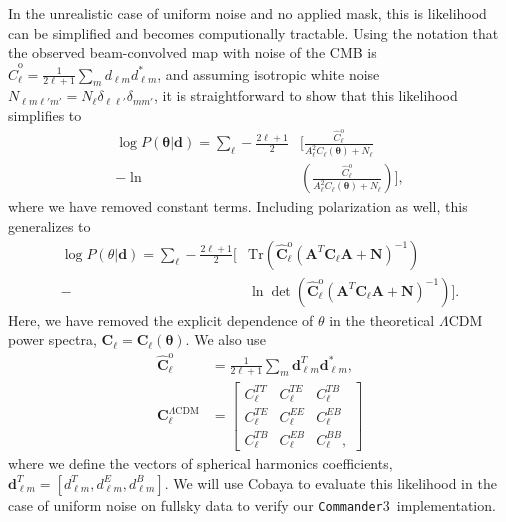 \documentclass[twocolumn]{../common/aa}
\def\commander{\texttt{Commander}}
\begin{document}
In the unrealistic case of uniform noise and no applied mask, this is likelihood can be simplified and becomes computionally tractable. Using the notation that the observed beam-convolved map with noise of the CMB is $\hat{C}^{\mathrm{o}}_{\ell} = \frac{1}{2\ell+1}\sum_m d_{\ell m}d^*_{\ell m}$, and assuming isotropic white noise $N_{\ell m \ell'm'} = N_\ell \delta_{\ell \ell'}\delta_{mm'}$, it is straightforward to show that this likelihood simplifies to
\begin{align}
    \nonumber
    \log P(\boldsymbol{\theta} | \boldsymbol{d}) = \sum_{\ell} -\frac{2\ell+1}{2} &\bigg[\frac{\hat{C}^{\mathrm{o}}_{\ell}}{A_\ell^2 C_{\ell}(\boldsymbol{\theta}) + N_\ell}\\
    -\ln &\left(\frac{\hat{C}^{\mathrm{o}}_{\ell}}{A_\ell^2 C_{\ell}(\boldsymbol{\theta}) + N_\ell} \right) \bigg],
\end{align}
where we have removed constant terms. Including polarization as well, this generalizes to \citep{Hamimeche:2008ai}
\begin{align}
    \nonumber
    \log P(\theta | \boldsymbol{d}) = \sum_\ell -\frac{2\ell+1}{2} \bigg[&\mathrm{Tr}\left(\hat{\boldsymbol C}^{\mathrm{o}}_{\ell}  \left(\boldsymbol{A}^T \boldsymbol{C}_{\ell} \boldsymbol{A} + \boldsymbol{N}\right)^{-1}\right)\\
    - &\ln \det \left(\hat{\boldsymbol C}^\mathrm{o}_{\ell}  \left(\boldsymbol{A}^T \boldsymbol{C}_{\ell} \boldsymbol{A} + \boldsymbol{N}\right)^{-1}\right)\bigg].
\end{align}
Here, we have removed the explicit dependence of $\theta$ in the theoretical $\Lambda$CDM power spectra, $\boldsymbol{C}_{\ell} = \boldsymbol{C}_{\ell}(\boldsymbol{\theta})$. We also use
\begin{align}
    \hat{\boldsymbol C}^{\mathrm{o}}_{\ell} &= \frac{1}{2\ell+1}\sum_m \boldsymbol{d}_{\ell m}^T \boldsymbol{d}^*_{\ell m},\\
    \boldsymbol{C}^{\Lambda\mathrm{CDM}}_{\ell} &= \begin{bmatrix}
        C^{TT}_\ell & C^{TE}_\ell & C^{TB}_\ell\\
        C^{TE}_\ell & C^{EE}_\ell & C^{EB}_\ell\\
        C^{TB}_\ell & C^{EB}_\ell & C^{BB}_\ell,
    \end{bmatrix}
\end{align}
where we define the vectors of spherical harmonics coefficients, ${\boldsymbol{d}_{\ell m}^T = [d^T_{\ell m}, d^E_{\ell m}, d^B_{\ell m}]}$. We will use Cobaya \citep{Torrado:2020dgo} to evaluate this likelihood in the case of uniform noise on fullsky data to verify our \commander3\ implementation.
\end{document}

